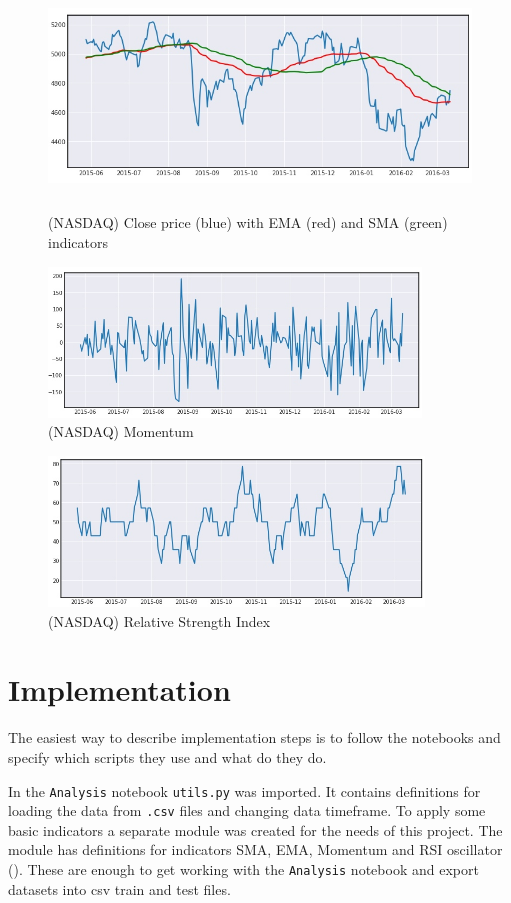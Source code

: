 \documentclass[a4paper,12pt]{article}
\begin{document}
\begin{figure}[h]
	\includegraphics[height=6cm,width=\textwidth]{nasdaqClose}
	\caption{(NASDAQ) Close price (blue) with EMA (red) and SMA (green) indicators}
	\centering
\end{figure}
\begin{figure}[h]
	\includegraphics[height=4cm,width=\textwidth]{nasdaqMom}
	\caption{(NASDAQ) Momentum}
	\centering
\end{figure}
\begin{figure}[h]
	\includegraphics[height=4cm,width=\textwidth]{nasdaqRSI}
	\caption{(NASDAQ) Relative Strength Index}
	\centering
\end{figure}

\section{Implementation}
The easiest way to describe implementation steps is to follow the notebooks and specify which scripts they use and what do they do.

In the \texttt{Analysis} notebook \texttt{utils.py} was imported. It contains definitions for loading the data from \texttt{.csv} files and changing data timeframe. To apply some basic indicators a separate module was created for the needs of this project. The module has definitions for indicators SMA, EMA, Momentum and RSI oscillator (\cite{Indicies}). These are enough to get working with the \texttt{Analysis} notebook and export datasets into csv train and test files.
\end{document}
